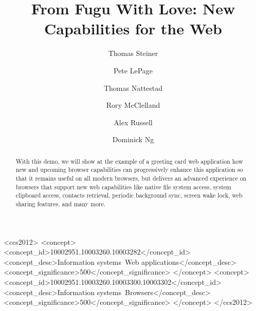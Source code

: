 \documentclass[sigconf]{acmart}
\begin{document}
\title{From Fugu With Love: New Capabilities for the Web}

\author{Thomas Steiner}

\author{Pete LePage}

\author{Thomas Nattestad}
\author{Rory McClelland}

\author{Alex Russell}

\author{Dominick Ng}

\renewcommand{\shortauthors}{Thomas Steiner, Pete LePage, Thomas Nattestad, \textit{et al.}}

\begin{abstract}
With this demo, we will show at the example of a greeting card web application
how new and upcoming browser capabilities can progressively enhance
this application so that it remains useful on all modern browsers,
but delivers an advanced experience on browsers that support new web capabilities
like native file system access, system clipboard access, contacts retrieval,
periodic background sync, screen wake lock, web sharing features, and many more.
\end{abstract}

\begin{CCSXML}
<ccs2012>
<concept>
<concept_id>10002951.10003260.10003282</concept_id>
<concept_desc>Information systems~Web applications</concept_desc>
<concept_significance>500</concept_significance>
</concept>
<concept>
<concept_id>10002951.10003260.10003300.10003302</concept_id>
<concept_desc>Information systems~Browsers</concept_desc>
<concept_significance>500</concept_significance>
</concept>
</ccs2012>
\end{CCSXML}
\end{document}

